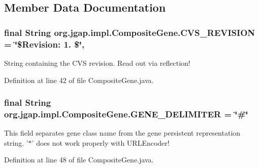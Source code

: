 \subsection{Member Data Documentation}
\hypertarget{classorg_1_1jgap_1_1impl_1_1_composite_gene_a9a4802f5b06ad58a96f1a40b60f836c6}{
\subsubsection[{C\-V\-S\-\_\-\-R\-E\-V\-I\-S\-I\-O\-N}]{\setlength{\rightskip}{0pt plus 5cm}final String org.\-jgap.\-impl.\-Composite\-Gene.\-C\-V\-S\-\_\-\-R\-E\-V\-I\-S\-I\-O\-N = \char`\"{}\$Revision\-: 1. \$\char`\"{}\hspace{0.3cm}{\ttfamily [static]}, {\ttfamily [private]}}}\label{classorg_1_1jgap_1_1impl_1_1_composite_gene_a9a4802f5b06ad58a96f1a40b60f836c6}
String containing the C\-V\-S revision. Read out via reflection! 

Definition at line 42 of file Composite\-Gene.\-java.

\hypertarget{classorg_1_1jgap_1_1impl_1_1_composite_gene_ad2e0364fa1181ae5b7334a545864f96b}{
\subsubsection[{G\-E\-N\-E\-\_\-\-D\-E\-L\-I\-M\-I\-T\-E\-R}]{\setlength{\rightskip}{0pt plus 5cm}final String org.\-jgap.\-impl.\-Composite\-Gene.\-G\-E\-N\-E\-\_\-\-D\-E\-L\-I\-M\-I\-T\-E\-R = \char`\"{}\#\char`\"{}\hspace{0.3cm}{\ttfamily [static]}}}\label{classorg_1_1jgap_1_1impl_1_1_composite_gene_ad2e0364fa1181ae5b7334a545864f96b}
This field separates gene class name from the gene persistent representation string. '$\ast$' does not work properly with U\-R\-L\-Encoder! 

Definition at line 48 of file Composite\-Gene.\-java.



